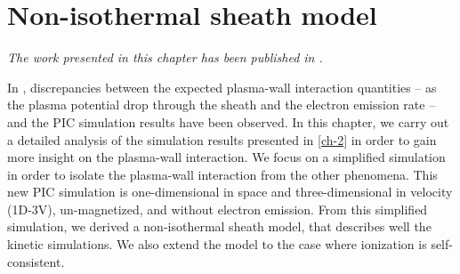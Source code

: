 



\chapter{Non-isothermal sheath model}
\label{ch-3}



\begin{Chabstract}
  
\emph{The work presented in this chapter has been published in  \citet{tavant2019}.}
\end{Chabstract}

\vspace{1ex}

\begin{Chabstract}
  
  In , discrepancies between the expected plasma-wall interaction quantities -- as the plasma potential drop through the sheath and the electron emission rate -- and the \ac{PIC} simulation results have been observed.
  In this chapter, we carry out a detailed analysis of the simulation results presented in \cref{ch-2}  in order to gain more insight on the plasma-wall interaction.
  We focus on a simplified simulation in order to isolate the plasma-wall interaction from the other phenomena.
  This new \ac{PIC} simulation is one-dimensional in space and three-dimensional in velocity (\acs{1D}-\acs{3V}), un-magnetized, and without electron emission.
  From this simplified simulation, we derived a non-isothermal sheath model, that describes well the kinetic simulations.
  We also extend the model to the case where ionization is self-consistent.

\end{Chabstract}

\minitoc










